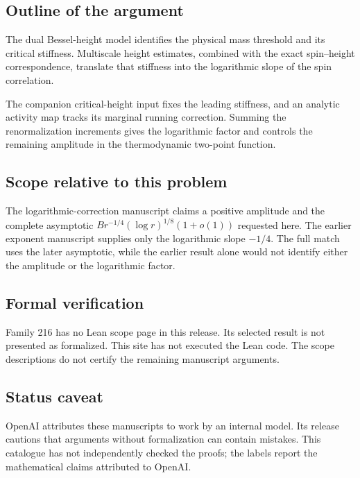 \documentclass[11pt]{article}
\begin{document}
\subsection{Outline of the argument}
The dual Bessel-height model identifies the physical mass threshold and its critical stiffness. Multiscale height estimates, combined with the exact spin--height correspondence, translate that stiffness into the logarithmic slope of the spin correlation.

The companion critical-height input fixes the leading stiffness, and an analytic activity map tracks its marginal running correction. Summing the renormalization increments gives the logarithmic factor and controls the remaining amplitude in the thermodynamic two-point function.

\subsection{Scope relative to this problem}
The logarithmic-correction manuscript claims a positive amplitude and the complete asymptotic $B r^{-1/4}(\log r)^{1/8}(1+o(1))$ requested here. The earlier exponent manuscript supplies only the logarithmic slope $-1/4$. The full match uses the later asymptotic, while the earlier result alone would not identify either the amplitude or the logarithmic factor.

\subsection{Formal verification}
Family 216 has no Lean scope page in this release. Its selected result is not presented as formalized. This site has not executed the Lean code. The scope descriptions do not certify the remaining manuscript arguments.

\subsection{Status caveat}
OpenAI attributes these manuscripts to work by an internal model. Its release cautions that arguments without formalization can contain mistakes. This catalogue has not independently checked the proofs; the labels report the mathematical claims attributed to OpenAI.
\end{document}
